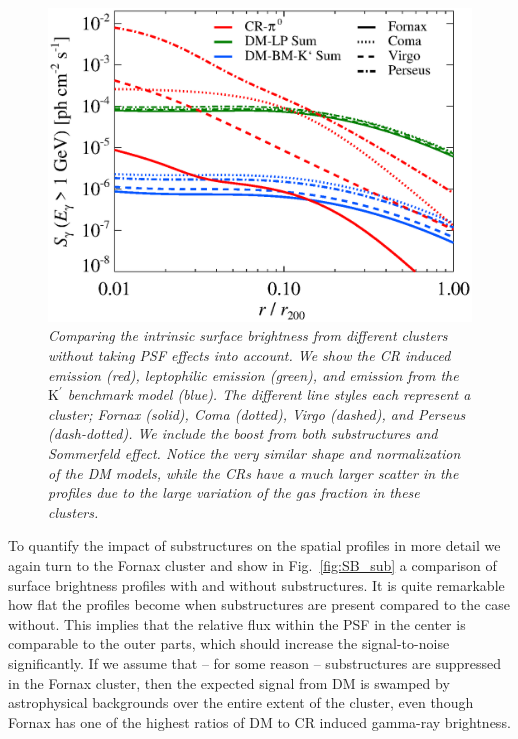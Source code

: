 \documentclass[10pt,aps,pra,reprint,amsmath,amsfonts,amssymb,showpacs,nofootinbib,floatfix]{revtex4-1}
\newcommand{\rmn}{\mathrm}
\newcommand{\Kp}{\rmn{K}^\prime}
\begin{document}
\begin{figure}
 \includegraphics[width=0.99\columnwidth]{figures/SB.v12.1GeV.SF300.SubMass.elmu.eps}
 \caption{\it Comparing the intrinsic surface brightness from
   different clusters without taking PSF effects into account. We show
   the CR induced emission (red), leptophilic emission (green), and
   emission from the $\Kp$ benchmark model (blue). The different line
   styles each represent a cluster; Fornax (solid), Coma (dotted),
   Virgo (dashed), and Perseus (dash-dotted). We include the boost
   from both substructures and Sommerfeld effect. Notice the very
   similar shape and normalization of the DM models, while the CRs
   have a much larger scatter in the profiles due to the large
   variation of the gas fraction in these clusters.}
 \label{fig:SB_clu}
\end{figure}

To quantify the impact of substructures on the spatial profiles in
more detail we again turn to the Fornax cluster and show in
Fig.~\ref{fig:SB_sub} a comparison of surface brightness profiles with
and without substructures. It is quite remarkable how flat the
profiles become when substructures are present compared to the case
without. This implies that the relative flux within the PSF in the
center is comparable to the outer parts, which should increase the
signal-to-noise significantly. If we assume that -- for
some reason -- substructures are suppressed in the Fornax cluster, then the expected
signal from DM is swamped by astrophysical backgrounds over the entire
extent of the cluster, even though Fornax has one of the highest
ratios of DM to CR induced gamma-ray brightness.
\end{document}
